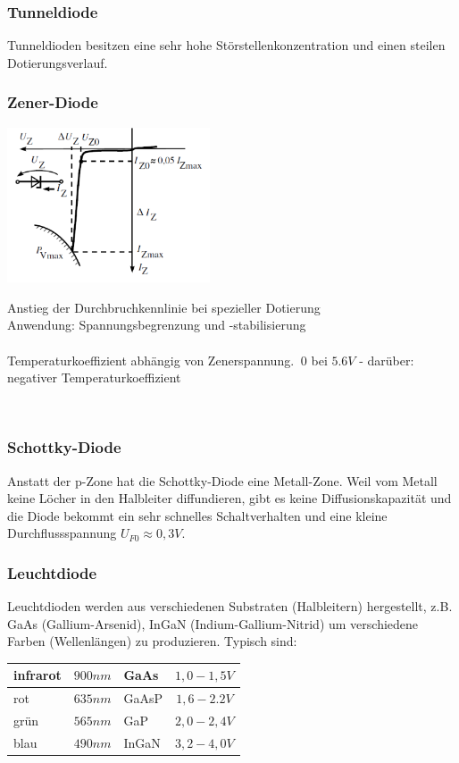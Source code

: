 		\subsubsection{Tunneldiode}
			Tunneldioden besitzen eine sehr hohe Störstellenkonzentration und einen
			steilen Dotierungsverlauf. 
			
		\subsubsection{Zener-Diode}
			\begin{minipage}[c]{6cm}
				\includegraphics[width=6cm]{./images/zdiode-kennlinie.png}
			\end{minipage}
			\begin{minipage}[t]{12cm}
				Anstieg der Durchbruchkennlinie bei spezieller Dotierung \\
				Anwendung: Spannungsbegrenzung und -stabilisierung  \\
				\\
				Temperaturkoeffizient abhängig von Zenerspannung. $~0$ bei $5.6V$ -
				darüber: negativer Temperaturkoeffizient\\
			\end{minipage} \\
			
		\subsubsection{Schottky-Diode}
			Anstatt der p-Zone hat die Schottky-Diode eine Metall-Zone. Weil vom Metall
			keine Löcher in den Halbleiter diffundieren, gibt es keine Diffusionskapazität
			und die Diode bekommt ein sehr schnelles Schaltverhalten und eine kleine
			Durchflussspannung $U_{F0} \approx 0,3V$. \\
			
		\subsubsection{Leuchtdiode}
			Leuchtdioden werden aus verschiedenen Substraten (Halbleitern) hergestellt,
			z.B. GaAs (Gallium-Arsenid), InGaN (Indium-Gallium-Nitrid) um verschiedene
			Farben (Wellenlängen) zu produzieren. Typisch sind: \\
			\begin{tabular}{|l|l|l|c|} \hline
				infrarot & $900nm$ & GaAs & $1,0-1,5V$ \\ \hline
				rot & $635nm$ & GaAsP & $1,6-2.2V$ \\ \hline
				grün & $565nm$ & GaP & $2,0-2,4V$ \\ \hline
				blau & $490nm$ & InGaN & $3,2-4,0V$ \\ \hline
			\end{tabular}\\
			
